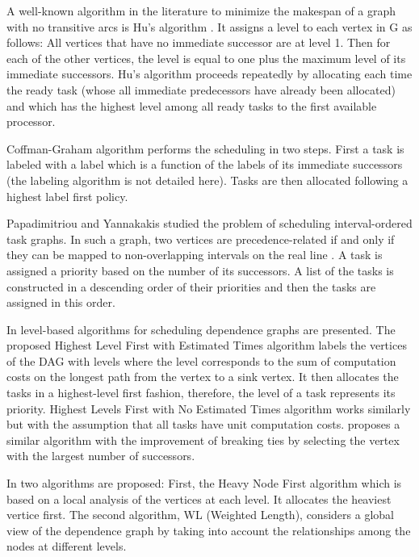 A well-known algorithm in the literature to minimize the makespan of a graph with no transitive arcs is Hu's algorithm \cite{hu:1961}. It assigns a level to each vertex in G as follows: All vertices that have no immediate successor are at level 1. Then for each of the other vertices, the level is equal to one plus the maximum level of its immediate successors. Hu's algorithm proceeds repeatedly by allocating each time the ready task (whose all immediate predecessors have already been allocated) and which has the highest level among all ready tasks to the first available processor. 

Coffman-Graham algorithm \cite{coffman:1972} performs the scheduling in two steps. First a task is labeled with a label which is a function of the labels of its immediate successors (the labeling algorithm is not detailed here). Tasks are then allocated following a highest label first policy. 

Papadimitriou and Yannakakis \cite{papadimitriou:1979} studied the problem of scheduling interval-ordered task graphs. In such a graph, two vertices are precedence-related if and only if they can be mapped to non-overlapping intervals on the real line \cite{fishburn:1985}. A task is assigned a priority based on the number of its successors. A list of the tasks is constructed in a descending order of their priorities and then the tasks are assigned in this order. 

In \cite{adam:1974} level-based algorithms for scheduling dependence graphs are presented. The proposed Highest Level First with Estimated Times algorithm labels the vertices of the DAG with levels where the level corresponds to the sum of computation costs on the longest path from the vertex to a sink vertex. It then allocates the tasks in a highest-level first fashion, therefore, the level of a task represents its priority. Highest Levels First with No Estimated Times algorithm works similarly but with the assumption that all tasks have unit computation costs. \cite{kasahara:1984} proposes a similar algorithm with the improvement of breaking ties by selecting the vertex with the largest number of successors. 

In \cite{shirazi:1990} two algorithms are proposed: First, the Heavy Node First algorithm which is based on a local analysis of the vertices at each level. It allocates the heaviest vertice first. The second algorithm, WL (Weighted Length), considers a global view of the dependence graph by taking into account the relationships among the nodes at different levels. 

